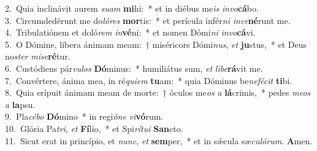 {2.~}Quia inclinávit aurem \textit{su}\textit{am} \textbf{mi}hi:~* et in diébus me\textit{is} \textit{in}\textit{vo}\textbf{cá}bo.\\
{3.~}Circumdedérunt me do\textit{ló}\textit{res} \textbf{mor}tis:~* et perícula infér\textit{ni} \textit{in}\textit{ve}\textbf{né}runt me.\\
{4.~}Tribulatiónem et doló\textit{rem} \textit{in}\textbf{vé}ni:~* et nomen Dómi\textit{ni} \textit{in}\textit{vo}\textbf{cá}vi.\\
{5.~}O Dómine, líbera ánimam meam:~† miséricors Dómi\textit{nus}, \textit{et} \textbf{ju}stus,~* et Deus no\textit{ster} \textit{mi}\textit{se}\textbf{ré}tur.\\
{6.~}Custódiens pár\textit{vu}\textit{los} \textbf{Dó}minus:~* humiliátus sum, \textit{et} \textit{li}\textit{be}\textbf{rá}vit me.\\
{7.~}Convértere, ánima mea, in ré\textit{qui}\textit{em} \textbf{tu}am:~* quia Dóminus be\textit{ne}\textit{fé}\textit{cit} \textbf{ti}bi.\\
{8.~}Quia erípuit ánimam meam de morte:~† óculos me\textit{os} \textit{a} \textbf{lá}crimis,~* pedes \textit{me}\textit{os} \textit{a} \textbf{la}psu.\\
{9.~}Pla\textit{cé}\textit{bo} \textbf{Dó}mino~* in regi\textit{ó}\textit{ne} \textit{vi}\textbf{vó}rum.\\
{10.~}Glória Pa\textit{tri}, \textit{et} \textbf{Fí}lio,~* et Spi\textit{rí}\textit{tu}\textit{i} \textbf{San}cto.\\
{11.~}Sicut erat in princípio, et \textit{nunc}, \textit{et} \textbf{sem}per,~* et in sǽcula sæ\textit{cu}\textit{ló}\textit{rum}. \textbf{A}men.\\
